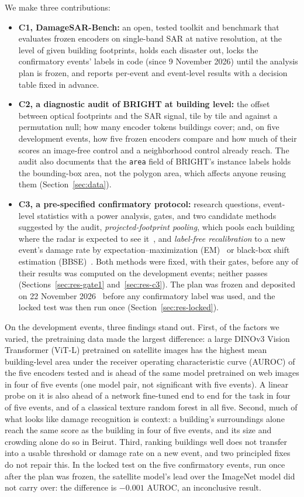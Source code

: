 \documentclass{ieeeaccess}
\begin{document}
We make three contributions:
\begin{itemize}
\item \textbf{C1, DamageSAR-Bench:} an open, tested toolkit and benchmark that evaluates frozen encoders on single-band SAR at native resolution, at the level of given building footprints, holds each disaster out, locks the confirmatory events' labels in code (since 9 November 2026) until the analysis plan is frozen, and reports per-event and event-level results with a decision table fixed in advance.
\item \textbf{C2, a diagnostic audit of BRIGHT at building level:} the offset between optical footprints and the SAR signal, tile by tile and against a permutation null; how many encoder tokens buildings cover; and, on five development events, how five frozen encoders compare and how much of their scores an image-free control and a neighborhood control already reach. The audit also documents that the \texttt{area} field of BRIGHT's instance labels holds the bounding-box area, not the polygon area, which affects anyone reusing them (Section~\ref{sec:data}).
\item \textbf{C3, a pre-specified confirmatory protocol:} research questions, event-level statistics with a power analysis, gates, and two candidate methods suggested by the audit, \emph{projected-footprint pooling}, which pools each building where the radar is expected to see it~\cite{liu2014height,brunner2010earthquake}, and \emph{label-free recalibration} to a new event's damage rate by expectation--maximization (EM)~\cite{saerens2002adjusting} or black-box shift estimation (BBSE)~\cite{lipton2018bbse}. Both methods were fixed, with their gates, before any of their results was computed on the development events; neither passes (Sections~\ref{sec:res-gate1} and~\ref{sec:res-c3}). The plan was frozen and deposited on 22 November 2026~\cite{lehan2026prereg} before any confirmatory label was used, and the locked test was then run once (Section~\ref{sec:res-locked}).
\end{itemize}

On the development events, three findings stand out. First, of the factors we varied, the pretraining data made the largest difference: a large DINOv3 Vision Transformer (ViT-L) pretrained on satellite images has the highest mean building-level area under the receiver operating characteristic curve (AUROC) of the five encoders tested and is ahead of the same model pretrained on web images in four of five events (one model pair, not significant with five events). A linear probe on it is also ahead of a network fine-tuned end to end for the task in four of five events, and of a classical texture random forest in all five. Second, much of what looks like damage recognition is context: a building's surroundings alone reach the same score as the building in four of five events, and its size and crowding alone do so in Beirut. Third, ranking buildings well does not transfer into a usable threshold or damage rate on a new event, and two principled fixes do not repair this. In the locked test on the five confirmatory events, run once after the plan was frozen, the satellite model's lead over the ImageNet model did not carry over: the difference is $-0.001$ AUROC, an inconclusive result.
\end{document}
